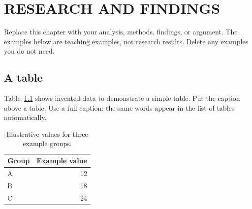 \chapter{RESEARCH AND FINDINGS}
\label{chap:research}
Replace this chapter with your analysis, methods, findings, or argument.
The examples below are teaching examples, not research results.
Delete any examples you do not need.

\section{A table}
Table~\ref{tab:example} shows invented data to demonstrate a simple table.
Put the caption above a table. Use a full caption: the same words appear in the
list of tables automatically.

\begin{table}[htbp]
  \centering
  \caption{Illustrative values for three example groups.}
  \label{tab:example}
  \begin{tabular}{lr}
    \toprule
    Group & Example value \\
    \midrule
    A & 12 \\
    B & 18 \\
    C & 24 \\
    \bottomrule
  \end{tabular}
\end{table}

